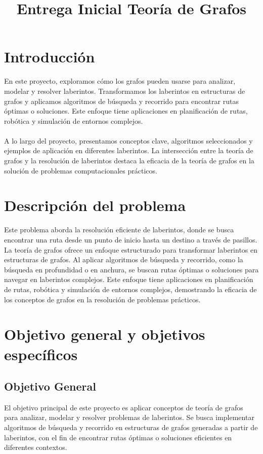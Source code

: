 \documentclass[conference]{IEEEtran}
\title{Entrega Inicial Teoría de Grafos}
\author{
	\IEEEauthorblockN{Juan Sebastian Pedraza Guevara }
	\IEEEauthorblockN{Juan José Zuluaga Patiño }
	\IEEEauthorblockN{Sergio Acosta }
	\IEEEauthorblockA{\textit{Escuela de Ingeniería Ciencia y Tecnología} \\
		\textit{Matemáticas Aplicadas y Ciencias de la Computación}\\
		\textit{Universidad del Rosario}\\
		Bogotá , Colombia\\
	}
	
	
}
\begin{document}
	
	\maketitle
	
	
	\section{Introducción}
	En este proyecto, exploramos cómo los grafos pueden usarse para analizar, modelar y resolver laberintos. Transformamos los laberintos en estructuras de grafos y aplicamos algoritmos de búsqueda y recorrido para encontrar rutas óptimas o soluciones. Este enfoque tiene aplicaciones en planificación de rutas, robótica y simulación de entornos complejos. 
	\\ 
	\\
	A lo largo del proyecto, presentamos conceptos clave, algoritmos seleccionados y ejemplos de aplicación en diferentes  laberintos. La intersección entre la teoría de grafos y la resolución de laberintos destaca la eficacia de la teoría de grafos en la solución de problemas computacionales prácticos.
	
	\section{Descripción del problema}
	Este problema aborda la resolución eficiente de laberintos, donde se busca encontrar una ruta desde un punto de inicio hasta un destino a través de pasillos. La teoría de grafos ofrece un enfoque estructurado para transformar laberintos en estructuras de grafos. Al aplicar algoritmos de búsqueda y recorrido, como la búsqueda en profundidad o en anchura, se buscan rutas óptimas o soluciones para navegar en laberintos complejos. Este enfoque tiene aplicaciones en planificación de rutas, robótica y simulación de entornos complejos, demostrando la eficacia de los conceptos de grafos en la resolución de problemas prácticos.
	\section{Objetivo general y objetivos específicos}
	\subsection{Objetivo General}
	El objetivo principal de este proyecto es aplicar conceptos de teoría de grafos para analizar, modelar y resolver problemas de laberintos. Se busca implementar algoritmos de búsqueda y recorrido en estructuras de grafos generadas a partir de laberintos, con el fin de encontrar rutas óptimas o soluciones eficientes en diferentes contextos.
	\\
	\\
\end{document}
